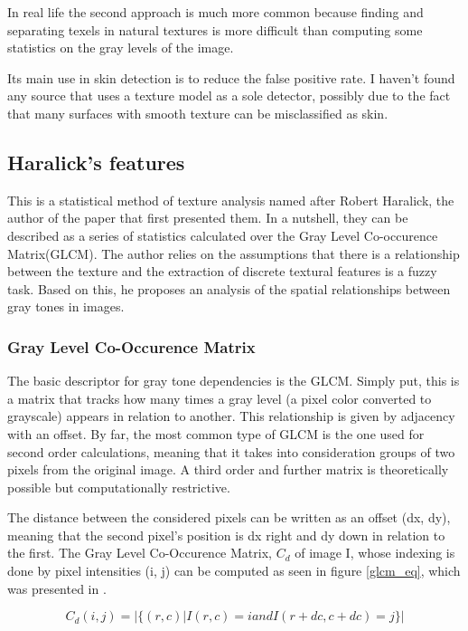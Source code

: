 \documentclass[12pt]{report}
\begin{document}
	In real life the second approach is much more common because finding and separating texels in natural textures is more difficult than computing some statistics on the gray levels of the image.
	
	Its main use in skin detection is to reduce the false positive rate. I haven’t found any source that uses a texture model as a sole detector, possibly due to the fact that many surfaces with smooth texture can be misclassified as skin.
	
	\subsection{Haralick's features}
	This is a statistical method of texture analysis named after Robert Haralick, the author of the paper that first presented them\cite{haralick_features}. In a nutshell, they can be described as a series of statistics calculated over the Gray Level Co-occurence Matrix(GLCM). The author relies on the assumptions that there is a relationship between the texture and the extraction of discrete textural features is a fuzzy task. Based on this, he proposes an analysis of the spatial relationships between gray tones in images.
	
	\subsubsection{Gray Level Co-Occurence Matrix}
	The basic descriptor for gray tone dependencies is the GLCM. Simply put, this is a matrix that tracks how many times a gray level (a pixel color converted to grayscale) appears in relation to another. This relationship is given by adjacency with an offset. By far, the most common type of GLCM is the one used for second order calculations, meaning that it takes into consideration groups of two pixels from the original image. A third order and further matrix is theoretically possible but computationally restrictive\cite{glcm_tutorial}.
	
	The distance between the considered pixels can be written as an offset (dx, dy), meaning that the second pixel's position is dx right and dy down in relation to the first. The Gray Level Co-Occurence Matrix, $C_d$ of image I, whose indexing is done by pixel intensities (i, j) can be computed as seen in figure \ref{glcm_eq}, which was presented in \cite{computer_vision_book}.
	
	\begin{equation} \label{glcm_eq}
	C_d(i, j) = | \{(r, c) | I(r, c) = i and I(r+dc, c + dc) = j\} |
	\end{equation}
	
\end{document}
